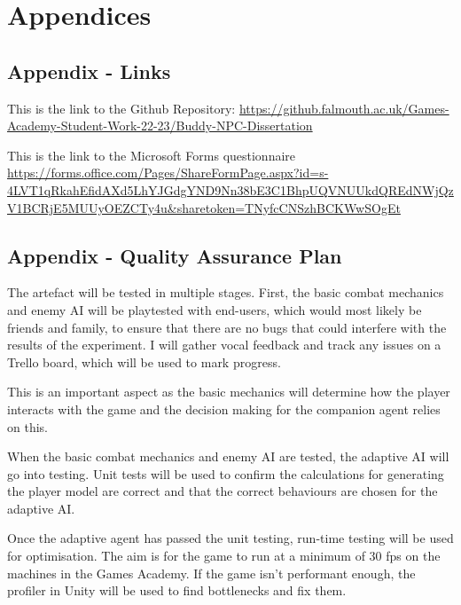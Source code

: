 \documentclass{IEEEtran}
\begin{document}
 \newpage

\onecolumn
\section{Appendices}
\label{Appendices}

\subsection{Appendix - Links}
\label{AppendixLinks}

This is the link to the Github Repository: \url{https://github.falmouth.ac.uk/Games-Academy-Student-Work-22-23/Buddy-NPC-Dissertation}

This is the link to the Microsoft Forms questionnaire \url{https://forms.office.com/Pages/ShareFormPage.aspx?id=s-4LVT1qRkahEfidAXd5LhYJGdgYND9Nn38bE3C1BhpUQVNUUkdQREdNWjQzV1BCRjE5MUUyOEZCTy4u&sharetoken=TNyfcCNSzhBCKWwSOgEt}

\subsection{Appendix - Quality Assurance Plan}
\label{AppendixQAPlan}


The artefact will be tested in multiple stages. First, the basic combat mechanics and enemy AI will be playtested with end-users, which would most likely be friends and family, to ensure that there are no bugs that could interfere with the results of the experiment. I will gather vocal feedback and track any issues on a Trello board, which will be used to mark progress.

This is an important aspect as the basic mechanics will determine how the player interacts with the game and the decision making for the companion agent relies on this.

When the basic combat mechanics and enemy AI are tested, the adaptive AI will go into testing. Unit tests will be used to confirm the calculations for generating the player model are correct and that the correct behaviours are chosen for the adaptive AI.

Once the adaptive agent has passed the unit testing, run-time testing will be used for optimisation. The aim is for the game to run at a minimum of 30 fps on the machines in the Games Academy. If the game isn't performant enough, the profiler in Unity will be used to find bottlenecks and fix them.
\end{document}
